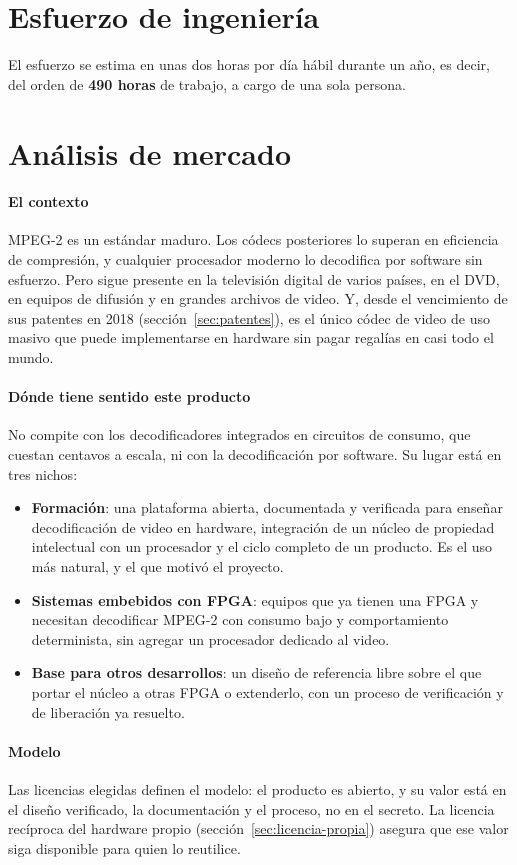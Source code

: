 \section{Esfuerzo de ingeniería}

El esfuerzo se estima en unas dos horas por día hábil durante un año, es
decir, del orden de \textbf{490 horas} de trabajo, a cargo de una sola
persona.

\section{Análisis de mercado}

\paragraph{El contexto}
MPEG-2 es un estándar maduro. Los códecs posteriores lo superan en
eficiencia de compresión, y cualquier procesador moderno lo decodifica por
software sin esfuerzo. Pero sigue presente en la televisión digital de
varios países, en el DVD, en equipos de difusión y en grandes archivos de
video. Y, desde el vencimiento de sus patentes en 2018
(sección~\ref{sec:patentes}), es el único códec de video de uso masivo que
puede implementarse en hardware sin pagar regalías en casi todo el mundo.

\paragraph{Dónde tiene sentido este producto}
No compite con los decodificadores integrados en circuitos de consumo, que
cuestan centavos a escala, ni con la decodificación por software. Su lugar
está en tres nichos:

\begin{itemize}
  \item \textbf{Formación}: una plataforma abierta, documentada y verificada
    para enseñar decodificación de video en hardware, integración de un núcleo
    de propiedad intelectual con un procesador y el ciclo completo de un
    producto. Es el uso más natural, y el que motivó el proyecto.
  \item \textbf{Sistemas embebidos con FPGA}: equipos que ya tienen una FPGA
    y necesitan decodificar MPEG-2 con consumo bajo y comportamiento
    determinista, sin agregar un procesador dedicado al video.
  \item \textbf{Base para otros desarrollos}: un diseño de referencia libre
    sobre el que portar el núcleo a otras FPGA o extenderlo, con un proceso
    de verificación y de liberación ya resuelto.
\end{itemize}

\paragraph{Modelo}
Las licencias elegidas definen el modelo: el producto es abierto, y su valor
está en el diseño verificado, la documentación y el proceso, no en el
secreto. La licencia recíproca del hardware propio
(sección~\ref{sec:licencia-propia}) asegura que ese valor siga disponible
para quien lo reutilice.
